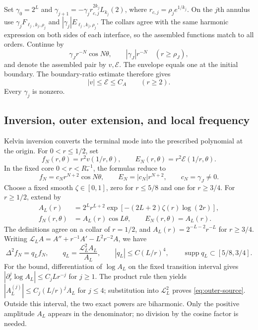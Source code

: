 \documentclass[11pt,twoside,leqno]{article}
\numberwithin{equation}{section}
\theoremstyle{definition}
\theoremstyle{remark}
\newcommand{\supp}{\operatorname{supp}}
\begin{document}
Set $\gamma_0=2^L$ and
$\gamma_{j+1}=-\gamma_jr_{c,j}^{2k_j}L_{k_j}(2)$, where
$r_{c,j}=\rho_je^{1/k_j}$. On the $j$th annulus use
$\gamma_jF_{\ell_j,k_j,\rho_j}$ and $|\gamma_j|E_{\ell_j,k_j,\rho_j}$.
The collars agree with the same harmonic expression on both sides of
each interface, so the assembled functions match to all orders.
Continue by
\[
 \gamma_Jr^{-N}\cos N\theta,\qquad |\gamma_J|r^{-N}
 \quad(r\ge\rho_J),
\]
and denote the assembled pair by $v,\mathcal E$.
The envelope equals one at the initial boundary. The boundary-ratio
estimate therefore gives
\begin{equation}\label{eq:exterior-envelope}
 |v|\le\mathcal E\le C_A\qquad(r\ge2).
\end{equation}
Every $\gamma_j$ is nonzero.

\subsection{Inversion, outer extension, and local frequency}

Kelvin inversion converts the terminal mode into the prescribed
polynomial at the origin. For $0<r\le1/2$, set
\begin{equation}\label{eq:prepared-inversion}
 f_N(r,\theta)=r^2v(1/r,\theta),\qquad
 E_N(r,\theta)=r^2\mathcal E(1/r,\theta).
\end{equation}
In the fixed core $0<r<R_*^{-1}$, the formulas reduce to
\begin{equation}\label{eq:core}
 f_N=c_Nr^{N+2}\cos N\theta,\qquad
 E_N=|c_N|r^{N+2},\qquad c_N=\gamma_J\ne0.
\end{equation}
Choose a fixed smooth $\zeta\in[0,1]$, zero for $r\le5/8$ and one
for $r\ge3/4$. For $r\ge1/2$, extend by
\begin{equation}\label{eq:outer}
 \begin{split}
 A_L(r)&=2^Lr^{L+2}\exp[-(2L+2)\zeta(r)\log(2r)],\\
 f_N(r,\theta)&=A_L(r)\cos L\theta,\qquad E_N(r,\theta)=A_L(r).
 \end{split}
\end{equation}
The definitions agree on a collar of $r=1/2$, and
$A_L(r)=2^{-L-2}r^{-L}$ for $r\ge3/4$.
Writing $\mathcal L_LA=A''+r^{-1}A'-L^2r^{-2}A$, we have
\begin{equation}\label{eq:outer-source}
 \Delta^2f_N=q_Lf_N,\qquad
 q_L=\frac{\mathcal L_L^2A_L}{A_L},\qquad
 |q_L|\le C(L/r)^4,\qquad \supp q_L\subset[5/8,3/4].
\end{equation}
For the bound, differentiation of $\log A_L$ on the fixed transition
interval gives $|\partial_r^j\log A_L|\le C_jLr^{-j}$ for $j\ge1$.
The product rule then yields $|A_L^{(j)}|\le C_j(L/r)^jA_L$ for $j\le4$;
substitution into $\mathcal L_L^2$ proves \eqref{eq:outer-source}.
Outside this interval, the two exact powers are biharmonic. Only the
positive amplitude $A_L$ appears in the denominator; no division by
the cosine factor is needed.
\end{document}
